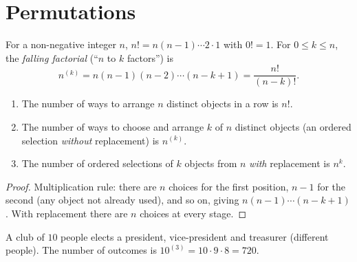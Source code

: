 \begin{center}
\end{center}

\section{Permutations}

\begin{definition}
For a non-negative integer $n$, $n! = n(n-1)\cdots 2\cdot 1$ with $0! = 1$. For
$0\le k\le n$, the \emph{falling factorial} (``$n$ to $k$ factors'') is
\[
  n^{(k)} = n(n-1)(n-2)\cdots(n-k+1) = \frac{n!}{(n-k)!}.
\]
\end{definition}

\begin{theorem}[Permutations]
\begin{enumerate}
  \item The number of ways to arrange $n$ distinct objects in a row is $n!$.
  \item The number of ways to choose and arrange $k$ of $n$ distinct objects (an ordered
        selection \emph{without} replacement) is $n^{(k)}$.
  \item The number of ordered selections of $k$ objects from $n$ \emph{with} replacement
        is $n^k$.
\end{enumerate}
\end{theorem}

\begin{proof}
Multiplication rule: there are $n$ choices for the first position, $n-1$ for the second
(any object not already used), and so on, giving $n(n-1)\cdots(n-k+1)$. With replacement
there are $n$ choices at every stage.
\end{proof}

\begin{example}[Officers]
A club of $10$ people elects a president, vice-president and treasurer (different
people). The number of outcomes is $10^{(3)} = 10\cdot 9\cdot 8 = 720$.
\end{example}

